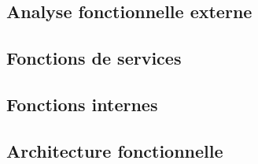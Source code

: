 \textcolor[RGB]{46, 116, 181}{\chapter{Analyse fonctionnelle externe}}
\section{Fonctions de services}

\section{Fonctions internes}

\section{Architecture fonctionnelle}
